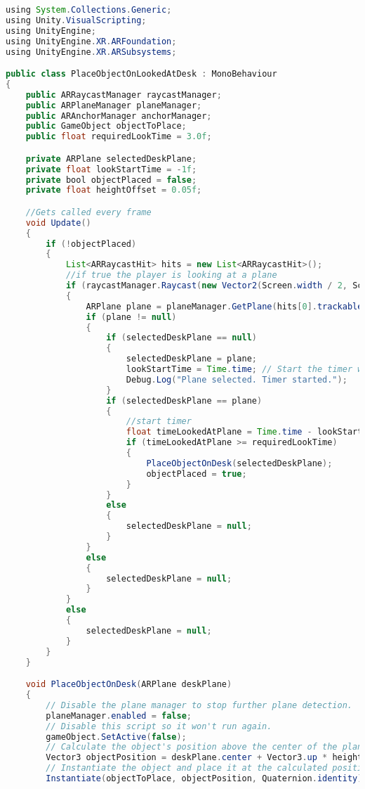 \begin{lstlisting}[language=Java, style=csharpstyle, caption=3D Objekt in der echten Welt platzieren]
using System.Collections.Generic;
using Unity.VisualScripting;
using UnityEngine;
using UnityEngine.XR.ARFoundation;
using UnityEngine.XR.ARSubsystems;

public class PlaceObjectOnLookedAtDesk : MonoBehaviour
{
    public ARRaycastManager raycastManager;
    public ARPlaneManager planeManager;
    public ARAnchorManager anchorManager;
    public GameObject objectToPlace;
    public float requiredLookTime = 3.0f;

    private ARPlane selectedDeskPlane;
    private float lookStartTime = -1f;
    private bool objectPlaced = false;
    private float heightOffset = 0.05f;

    //Gets called every frame
    void Update()
    {
        if (!objectPlaced)
        {
            List<ARRaycastHit> hits = new List<ARRaycastHit>();
            //if true the player is looking at a plane
            if (raycastManager.Raycast(new Vector2(Screen.width / 2, Screen.height / 2), hits, TrackableType.Planes))
            {
                ARPlane plane = planeManager.GetPlane(hits[0].trackableId);
                if (plane != null)
                {
                    if (selectedDeskPlane == null)
                    {
                        selectedDeskPlane = plane;
                        lookStartTime = Time.time; // Start the timer when a new plane is selected.
                        Debug.Log("Plane selected. Timer started.");
                    }
                    if (selectedDeskPlane == plane)
                    {
                        //start timer
                        float timeLookedAtPlane = Time.time - lookStartTime;
                        if (timeLookedAtPlane >= requiredLookTime)
                        {
                            PlaceObjectOnDesk(selectedDeskPlane);
                            objectPlaced = true;
                        }
                    }
                    else
                    {
                        selectedDeskPlane = null;
                    }
                }
                else
                {
                    selectedDeskPlane = null;
                }
            }
            else
            {
                selectedDeskPlane = null;
            }
        }
    }

    void PlaceObjectOnDesk(ARPlane deskPlane)
    {
        // Disable the plane manager to stop further plane detection.
        planeManager.enabled = false;
        // Disable this script so it won't run again.
        gameObject.SetActive(false);
        // Calculate the object's position above the center of the plane.
        Vector3 objectPosition = deskPlane.center + Vector3.up * heightOffset;
        // Instantiate the object and place it at the calculated position.
        Instantiate(objectToPlace, objectPosition, Quaternion.identity);



\end{lstlisting}
